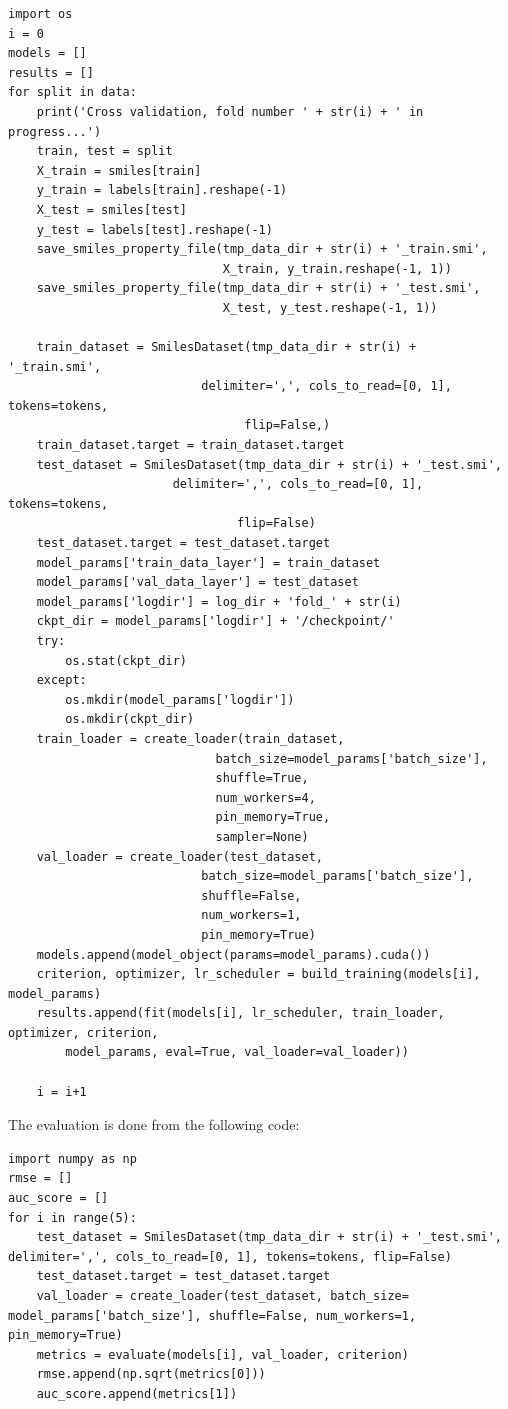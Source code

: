 \documentclass[a4paper]{article}
\begin{document}
\begin{lstlisting}
import os
i = 0
models = []
results = []
for split in data:
    print('Cross validation, fold number ' + str(i) + ' in progress...')
    train, test = split
    X_train = smiles[train]
    y_train = labels[train].reshape(-1)
    X_test = smiles[test]
    y_test = labels[test].reshape(-1)
    save_smiles_property_file(tmp_data_dir + str(i) + '_train.smi', 
                              X_train, y_train.reshape(-1, 1))
    save_smiles_property_file(tmp_data_dir + str(i) + '_test.smi', 
                              X_test, y_test.reshape(-1, 1))

    train_dataset = SmilesDataset(tmp_data_dir + str(i) + '_train.smi',
                           delimiter=',', cols_to_read=[0, 1], tokens=tokens,
                                 flip=False,)
    train_dataset.target = train_dataset.target
    test_dataset = SmilesDataset(tmp_data_dir + str(i) + '_test.smi',
                       delimiter=',', cols_to_read=[0, 1], tokens=tokens,
                                flip=False)
    test_dataset.target = test_dataset.target
    model_params['train_data_layer'] = train_dataset
    model_params['val_data_layer'] = test_dataset
    model_params['logdir'] = log_dir + 'fold_' + str(i)  
    ckpt_dir = model_params['logdir'] + '/checkpoint/'
    try:
        os.stat(ckpt_dir)
    except:
        os.mkdir(model_params['logdir'])
        os.mkdir(ckpt_dir)
    train_loader = create_loader(train_dataset,
                             batch_size=model_params['batch_size'],
                             shuffle=True,
                             num_workers=4,
                             pin_memory=True,
                             sampler=None)
    val_loader = create_loader(test_dataset,
                           batch_size=model_params['batch_size'],
                           shuffle=False,
                           num_workers=1,
                           pin_memory=True)
    models.append(model_object(params=model_params).cuda())
    criterion, optimizer, lr_scheduler = build_training(models[i], model_params)
    results.append(fit(models[i], lr_scheduler, train_loader, optimizer, criterion,
        model_params, eval=True, val_loader=val_loader))
    
    i = i+1
\end{lstlisting}

The evaluation is done from the following code:

\begin{lstlisting}
import numpy as np
rmse = []
auc_score = []
for i in range(5):
    test_dataset = SmilesDataset(tmp_data_dir + str(i) + '_test.smi', delimiter=',', cols_to_read=[0, 1], tokens=tokens, flip=False)
    test_dataset.target = test_dataset.target
    val_loader = create_loader(test_dataset, batch_size= model_params['batch_size'], shuffle=False, num_workers=1, pin_memory=True)
    metrics = evaluate(models[i], val_loader, criterion)
    rmse.append(np.sqrt(metrics[0]))
    auc_score.append(metrics[1])
\end{lstlisting}
\end{document}
